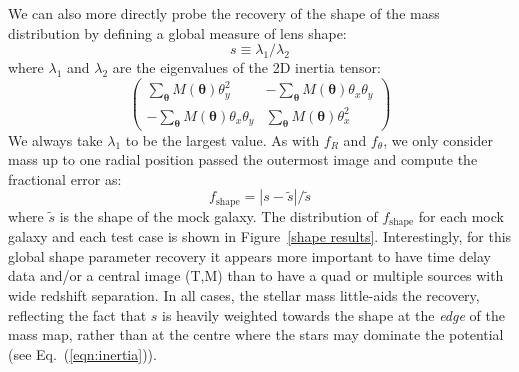 \documentclass[galley,usenatbib]{mn2e}
\renewcommand{\vec}[1]{\ensuremath{\boldsymbol{#1}}}
\newcommand{\figref}[1] {Figure~\ref{#1}}
\newcommand{\eqnref}[1] {Eq.~(\ref{#1})}
\begin{document}
We can also more directly probe the recovery of the shape of the mass
distribution by defining a global measure of lens shape:
%
\begin{equation} 
    s \equiv \lambda_1/\lambda_2
\end{equation} 
%
where $\lambda_1$ and $\lambda_2$ are the eigenvalues of the 2D inertia tensor:
%
\begin{equation}
\left(
\begin{matrix}
   \sum_{\vec\theta} M(\vec\theta) \theta^2_y 
    & - \sum_{\vec\theta} M(\vec\theta) \theta_x \theta_y \\
    - \sum_{\vec\theta} M(\vec\theta) \theta_x \theta_y
    & \sum_{\vec\theta} M(\vec\theta) \theta^2_x
\end{matrix}
\right)
    \label{eqn:inertia}
\end{equation}
%
We always take $\lambda_1$ to be the largest value. As with $f_R$ and
$f_\theta$, we only consider mass up to one radial position passed the
outermost image and compute the fractional error as:
%
\begin{equation} \label{ferror shape}
  f_\mathrm{shape} = \left|s - \tilde s\right|  / \tilde s
\end{equation}
%
where $\tilde s$ is the shape of the mock galaxy. The distribution of
$f_\mathrm{shape}$ for each mock galaxy and each test case is shown in
\figref{shape results}.  Interestingly, for this global shape parameter
recovery it appears more important to have time delay data and/or a central
image (T,M) than to have a quad or multiple sources with wide redshift
separation. In all cases, the stellar mass little-aids the recovery, reflecting
the fact that $s$ is heavily weighted towards the shape at the {\it edge} of
the mass map, rather than at the centre where the stars may dominate the
potential (see \eqnref{eqn:inertia}).
\end{document}
